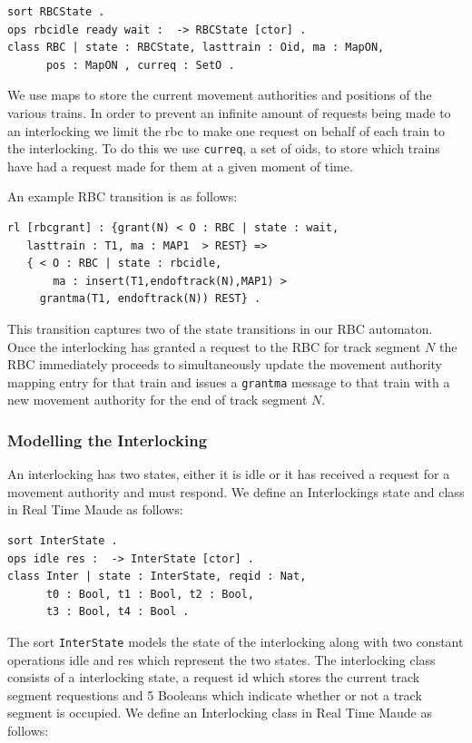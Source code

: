\begin{lstlisting}[caption = The RBC state and class definition in Maude]
sort RBCState .
ops rbcidle ready wait :  -> RBCState [ctor] .
class RBC | state : RBCState, lasttrain : Oid, ma : MapON, 
      pos : MapON , curreq : SetO .
\end{lstlisting}

We use maps to store the current movement authorities and positions of the various trains. In order to prevent an infinite amount of requests being made to an interlocking we limit the rbc to make one request on behalf of each train to the interlocking.  To do this we use  \texttt{curreq}, a set of oids, to store which trains have had a request made for them at a given moment of time.

An example RBC transition is as follows:
\begin{lstlisting}[caption = The state transition for the granting of a movement authority]
rl [rbcgrant] : {grant(N) < O : RBC | state : wait, 
   lasttrain : T1, ma : MAP1  > REST} => 
   { < O : RBC | state : rbcidle, 
       ma : insert(T1,endoftrack(N),MAP1) > 
     grantma(T1, endoftrack(N)) REST} .
\end{lstlisting}

This transition captures two of the state transitions in our RBC automaton. Once the interlocking has granted a request to the RBC for track segment $N$ the RBC immediately proceeds to simultaneously update the movement authority mapping entry for that train and issues a \texttt{grantma} message to that train with a new movement authority for the end of track segment $N$.

\subsubsection*{Modelling the Interlocking}
An interlocking has two states, either it is idle or it has received a request for a movement authority and must respond. We define an Interlockings state and class in Real Time Maude as follows:

\begin{lstlisting}[caption = The interlocking class and states in Maude]
sort InterState .
ops idle res :  -> InterState [ctor] .
class Inter | state : InterState, reqid : Nat, 
      t0 : Bool, t1 : Bool, t2 : Bool, 
      t3 : Bool, t4 : Bool .
\end{lstlisting}

The sort \texttt{InterState} models the state of the interlocking along with two constant operations idle and res which represent the two states. The interlocking class consists of a interlocking state, a request id which stores the current track segment requestions and 5 Booleans which indicate whether or not a track segment is occupied. We define an Interlocking class in Real Time Maude as follows:



